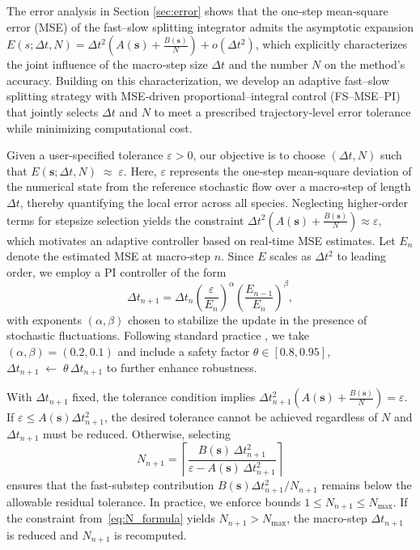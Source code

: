 \documentclass{article}
\begin{document}
\label{sec:MDE-Driven adpative control}

The error analysis in Section \ref{sec:error} shows that the one‑step mean‑square error (MSE) of the fast–slow splitting integrator admits the asymptotic expansion
$E(s;\Delta t, N)
=
\Delta t^{2}
\left(
A(\pmb{s}) + \frac{B(\pmb{s})}{N}
\right)
+ o(\Delta t^{2})$, which explicitly characterizes the joint influence of the macro‑step size $\Delta t$ and the number $N$ on the method’s accuracy.
Building on this characterization, we develop an adaptive fast–slow splitting strategy with MSE‑driven proportional–integral control (FS–MSE–PI) that jointly selects $\Delta t$ and $N$ to meet a prescribed trajectory‑level error tolerance while minimizing computational cost.

Given a user-specified tolerance $\varepsilon>0$, our objective is to choose
$(\Delta t,N)$ such that
$E(\pmb{s};\Delta t, N) \;\approx\; \varepsilon$. 
Here, $\varepsilon$ represents the one‑step mean‑square deviation of the numerical state from the reference stochastic flow over a macro‑step of length $\Delta t$, thereby quantifying the local error across all species.
Neglecting higher‑order terms for stepsize selection yields the constraint
\(
\Delta t^{2}\!\left( A(\pmb{s}) + \frac{B(\pmb{s})}{N} \right)
\approx \varepsilon,
\)
which motivates an adaptive controller based on real‑time MSE estimates.
Let $E_{n}$ denote the estimated MSE at macro‑step  $n$.  
Since $E$ scales as $\Delta t^{2}$
to leading order, we employ a PI controller of the form
\begin{equation}
\label{eq:PI_controller}
\Delta t_{n+1}
=
\Delta t_n
\left( \frac{\varepsilon}{E_n} \right)^{\alpha}
\left( \frac{E_{n-1}}{E_n} \right)^{\beta},
\end{equation}
with exponents $(\alpha, \beta)$ chosen to stabilize the update in the presence of stochastic
fluctuations. Following standard practice \cite{ilie2015adaptive}, we take
\(
(\alpha, \beta) = (0.2, 0.1)
\) 
and include a safety factor $\theta\in[0.8,0.95]$, 
$
\Delta t_{n+1}
\;\leftarrow\;
\theta\,\Delta t_{n+1}
$
to further enhance robustness.


With $\Delta t_{n+1}$ fixed, the tolerance condition implies
\(
\Delta t_{n+1}^{2}\!\left( A(\pmb{s}) + \frac{B(\pmb{s})}{N} \right)
= \varepsilon.
\) 
If $\varepsilon \le A(\pmb{s})\Delta t_{n+1}^{2}$, the desired tolerance cannot be achieved regardless of $N$ and $\Delta t_{n+1}$ must
be reduced.  Otherwise, selecting
\begin{equation}
\label{eq:N_formula}
N_{n+1}
=
\left\lceil
\frac{B(\pmb{s})\,\Delta t_{n+1}^{2}}
     {\varepsilon - A(\pmb{s})\,\Delta t_{n+1}^{2}}
\right\rceil
\end{equation}
ensures that the fast-substep contribution $B(\pmb{s})\Delta t_{n+1}^{2}/N_{n+1}$
remains below the allowable residual tolerance.
In practice, we enforce bounds 
$1\le N_{n+1}\le N_{\max}$.
If the constraint from~\eqref{eq:N_formula} yields $N_{n+1}>N_{\max}$,
the macro-step $\Delta t_{n+1}$ is reduced and $N_{n+1}$ is recomputed.
\end{document}
